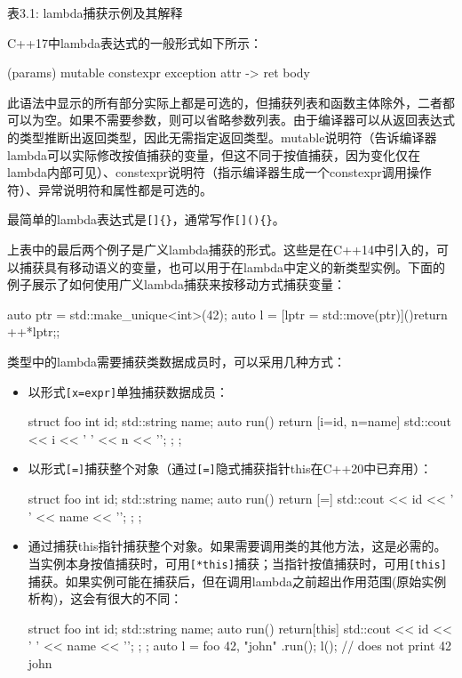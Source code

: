 \begin{center}
表3.1: lambda捕获示例及其解释
\end{center}

C++17中lambda表达式的一般形式如下所示：

\begin{cpp}
(params) mutable constexpr exception attr -> ret
{ body }
\end{cpp}

 此语法中显示的所有部分实际上都是可选的，但捕获列表和函数主体除外，二者都可以为空。如果不需要参数，则可以省略参数列表。由于编译器可以从返回表达式的类型推断出返回类型，因此无需指定返回类型。mutable说明符（告诉编译器lambda可以实际修改按值捕获的变量，但这不同于按值捕获，因为变化仅在lambda内部可见）、constexpr说明符（指示编译器生成一个constexpr调用操作符）、异常说明符和属性都是可选的。

\begin{myNotic}
最简单的lambda表达式是\verb|[]{}|，通常写作\verb|[](){}|。
\end{myNotic}

上表中的最后两个例子是广义lambda捕获的形式。这些是在C++14中引入的，可以捕获具有移动语义的变量，也可以用于在lambda中定义的新类型实例。下面的例子展示了如何使用广义lambda捕获来按移动方式捕获变量：

\begin{cpp}
auto ptr = std::make_unique<int>(42);
auto l = [lptr = std::move(ptr)](){return ++*lptr;};
\end{cpp}

类型中的lambda需要捕获类数据成员时，可以采用几种方式：

\begin{itemize}
\item
以形式\verb|[x=expr]|单独捕获数据成员：

\begin{cpp}
struct foo
{
    int         id;
    std::string name;
    auto run()
    {
        return [i=id, n=name] { std::cout << i << ' ' << n << '\n'; };
    }
};
\end{cpp}

\item
以形式\verb|[=]|捕获整个对象（通过\verb|[=]|隐式捕获指针this在C++20中已弃用）：

\begin{cpp}
struct foo
{
    int         id;
    std::string name;
    auto run()
    {
        return [=] { std::cout << id << ' ' << name << '\n'; };
    }
};
\end{cpp}

\item
通过捕获this指针捕获整个对象。如果需要调用类的其他方法，这是必需的。当实例本身按值捕获时，可用\verb|[*this]|捕获；当指针按值捕获时，可用\verb|[this]|捕获。如果实例可能在捕获后，但在调用lambda之前超出作用范围(原始实例析构)，这会有很大的不同：

\begin{cpp}
struct foo
{
    int         id;
    std::string name;
    auto run()
    {
        return[this]{ std::cout << id << ' ' << name << '\n'; };
    }
};
auto l = foo{ 42, "john" }.run();
l(); // does not print 42 john
\end{cpp}
\end{itemize}

